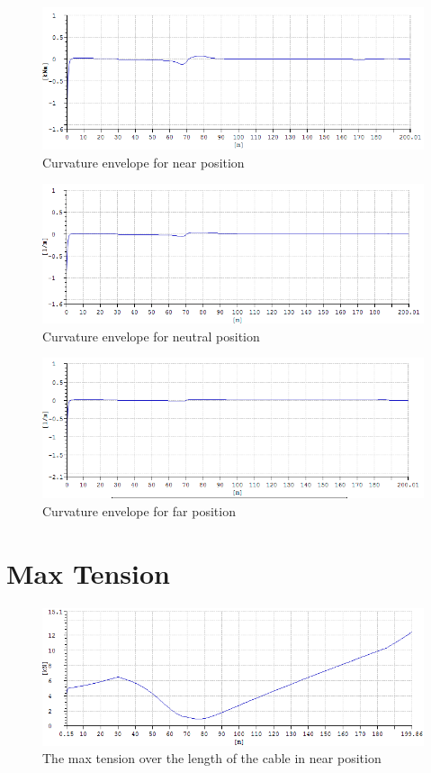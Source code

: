 \begin{figure}[H]
\centering
\includegraphics[scale=0.5]{figures/envcurvenear}
\caption{Curvature envelope for near position}
 \label{fig:envcurvenear}
\end{figure}

\begin{figure}[H]
\centering
\includegraphics[scale=0.5]{figures/envcurveneu}
\caption{Curvature envelope for neutral position}
 \label{fig:envcurveneu}
\end{figure}

\begin{figure}[H]
\centering
\includegraphics[scale=0.5]{figures/envcurvefar}
\caption{Curvature envelope for far position}
 \label{fig:envcurvefar}
\end{figure}

\section{Max Tension}

\begin{figure}[H]
\centering
\includegraphics[scale=0.5]{figures/fmaxnear}
\caption{The max tension over the length of the cable in near position}
 \label{fig:fmaxnear}
\end{figure}



